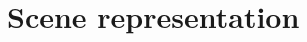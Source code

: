 \documentclass[dissertation.tex]{subfiles}
\begin{document}
\chapter{Scene representation}\label{cha:scene}
\end{document}
